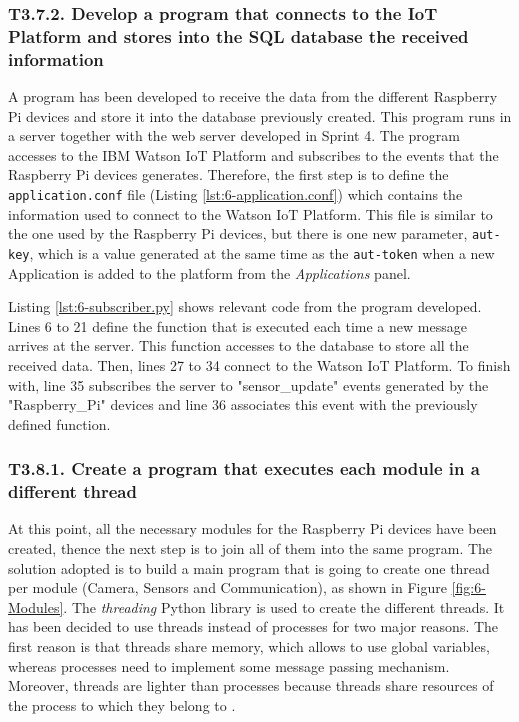 \subsubsection{T3.7.2. Develop a program that connects to the IoT Platform and stores into the SQL database the received information}

A program has been developed to receive the data from the different Raspberry Pi devices and store it into the database previously created. This program runs in a server together with the web server developed in Sprint 4. The program accesses to the IBM Watson IoT Platform and subscribes to the events that the Raspberry Pi devices generates. Therefore, the first step is to define the \texttt{application.conf} file (Listing \ref{lst:6-application.conf}) which contains the information used to connect to the Watson IoT Platform. This file is similar to the one used by the Raspberry Pi devices, but there is one new parameter, \texttt{aut-key}, which is a value generated at the same time as the \texttt{aut-token} when a new Application is added to the platform from the \textit{Applications} panel.

 


Listing \ref{lst:6-subscriber.py} shows relevant code from the program developed. Lines 6 to 21 define the function that is executed each time a new message arrives at the server. This function accesses to the database to store all the received data. Then, lines 27 to 34 connect to the Watson IoT Platform. To finish with, line 35 subscribes the server to "sensor\_update" events generated by the "Raspberry\_Pi" devices and line 36 associates this event with the previously defined function.




\subsubsection{T3.8.1. Create a program that executes each module in a different thread}

At this point, all the necessary modules for the Raspberry Pi devices have been created,  thence the next step is to join all of them into the same program. The solution adopted is to build a main program that is going to create one thread per module (Camera, Sensors and Communication), as shown in Figure \ref{fig:6-Modules}. The \textit{threading} Python library is used to create the different threads. It has been decided to use threads instead of processes for two major reasons. The first reason is that threads share memory, which allows to use global variables, whereas processes need to implement some message passing mechanism. Moreover, threads are lighter than processes because threads share resources of the process to which they belong to \cite{SGG06}.

